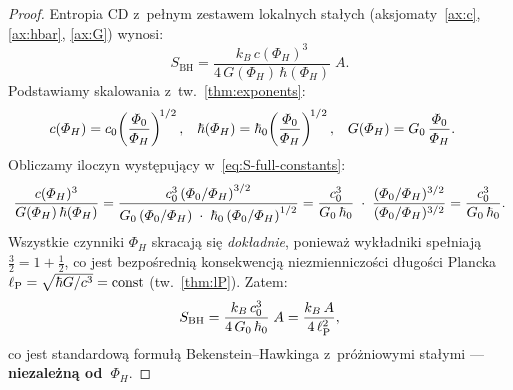 \begin{proof}
Entropia CD z~pe\l{}nym zestawem lokalnych sta\l{}ych
(aksjomaty~\ref{ax:c}, \ref{ax:hbar}, \ref{ax:G}) wynosi:
\begin{equation}\label{eq:S-full-constants}
    S_{\mathrm{BH}}
    = \frac{k_B\,c(\Phi_H)^3}{4\,G(\Phi_H)\,\hbar(\Phi_H)}\;A.
\end{equation}
Podstawiamy skalowania z~tw.~\ref{thm:exponents}:
\begin{align}
    c(\varPhi_H) &= c_0\!\left(\frac{\varPhi_0}{\varPhi_H}\right)^{\!1/2},
    &
    \hbar(\varPhi_H) &= \hbar_0\!\left(\frac{\varPhi_0}{\varPhi_H}\right)^{\!1/2},
    &
    G(\varPhi_H) &= G_0\,\frac{\varPhi_0}{\varPhi_H}. \notag
\end{align}
Obliczamy iloczyn wyst\k{e}puj\k{a}cy w~\eqref{eq:S-full-constants}:
\begin{equation}\label{eq:cancellation}
    \frac{c(\varPhi_H)^3}{G(\varPhi_H)\,\hbar(\varPhi_H)}
    = \frac{c_0^3\left(\varPhi_0/\varPhi_H\right)^{3/2}}
           {G_0\,(\varPhi_0/\varPhi_H)\;\cdot\;
            \hbar_0\left(\varPhi_0/\varPhi_H\right)^{1/2}}
    = \frac{c_0^3}{G_0\,\hbar_0}\;\cdot\;
      \frac{(\varPhi_0/\varPhi_H)^{3/2}}
           {(\varPhi_0/\varPhi_H)^{3/2}}
    = \frac{c_0^3}{G_0\,\hbar_0}.
\end{equation}
Wszystkie czynniki $\Phi_H$ skracaj\k{a} si\k{e} \emph{dok\l{}adnie},
poniewa\.z wyk\l{}adniki spe\l{}niaj\k{a}
$\tfrac{3}{2} = 1 + \tfrac{1}{2}$, co jest bezpo\'sredni\k{a}
konsekwencj\k{a} niezmienniczo\'sci d\l{}ugo\'sci Plancka
$\ell_{\mathrm{P}} = \sqrt{\hbar G/c^3} = \mathrm{const}$
(tw.~\ref{thm:lP}).
Zatem:
\begin{equation}\label{eq:S-BH-invariant}
    S_{\mathrm{BH}} = \frac{k_B\,c_0^3}{4\,G_0\,\hbar_0}\;A
    = \frac{k_B\,A}{4\,\ell_{\mathrm{P}}^2},
\end{equation}
co jest standardow\k{a} formu\l{}\k{a} Bekenstein--Hawkinga
z~pr\'o\.zniowymi sta\l{}ymi --- \textbf{niezale\.zn\k{a} od~$\Phi_H$}.


\end{proof}
